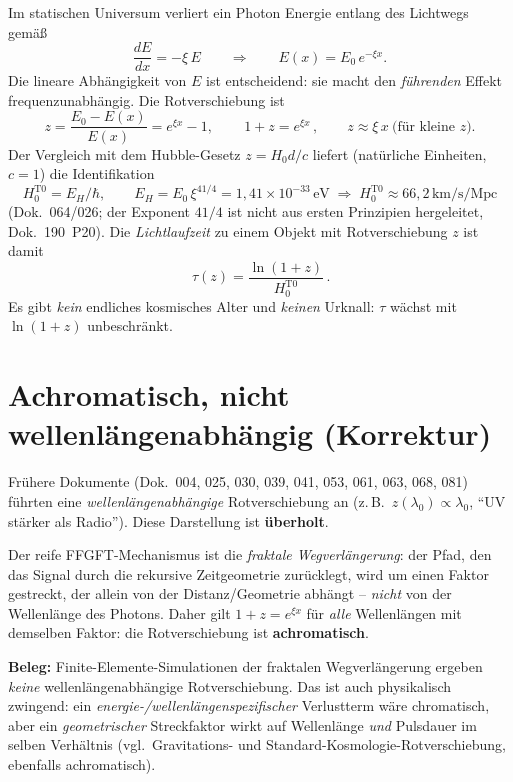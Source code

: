 Im statischen Universum verliert ein Photon Energie entlang des Lichtwegs gemäß
\[
  \frac{dE}{dx} = -\xi\,E
  \qquad\Longrightarrow\qquad
  E(x) = E_0\,e^{-\xi x}.
\]
Die lineare Abhängigkeit von $E$ ist entscheidend: sie macht den \emph{führenden}
Effekt frequenzunabhängig. Die Rotverschiebung ist
\[
  z = \frac{E_0 - E(x)}{E(x)} = e^{\xi x} - 1,
  \qquad
  \boxed{\,1+z = e^{\xi x}\,},
  \qquad z \approx \xi\,x \ \text{(für kleine } z).
\]
Der Vergleich mit dem Hubble-Gesetz $z = H_0 d/c$ liefert (natürliche Einheiten,
$c=1$) die Identifikation
\[
  H_0^{\text{T0}} = E_H/\hbar,\qquad E_H = E_0\,\xi^{41/4} = 1{,}41\times10^{-33}\,\text{eV}
  \;\Rightarrow\; H_0^{\text{T0}} \approx 66{,}2\,\text{km/s/Mpc}
\]
(Dok.~064/026; der Exponent $41/4$ ist nicht aus ersten Prinzipien hergeleitet,
Dok.~190~P20). Die \emph{Lichtlaufzeit} zu einem Objekt mit Rotverschiebung $z$ ist
damit
\[
  \boxed{\,\tau(z) = \frac{\ln(1+z)}{H_0^{\text{T0}}}\,}.
\]
Es gibt \emph{kein} endliches kosmisches Alter und \emph{keinen} Urknall: $\tau$
wächst mit $\ln(1+z)$ unbeschränkt.

\section{Achromatisch, nicht wellenlängenabhängig (Korrektur)}

Frühere Dokumente (Dok.~004, 025, 030, 039, 041, 053, 061, 063, 068, 081) führten
eine \emph{wellenlängenabhängige} Rotverschiebung an (z.\,B.\ $z(\lambda_0)\propto\lambda_0$,
\enquote{UV stärker als Radio}). Diese Darstellung ist \textbf{überholt}.

Der reife FFGFT-Mechanismus ist die \emph{fraktale Wegverlängerung}: der Pfad, den
das Signal durch die rekursive Zeitgeometrie zurücklegt, wird um einen Faktor
gestreckt, der allein von der Distanz/Geometrie abhängt -- \emph{nicht} von der
Wellenlänge des Photons. Daher gilt $1+z = e^{\xi x}$ für \emph{alle} Wellenlängen
mit demselben Faktor: die Rotverschiebung ist \textbf{achromatisch}.

\textbf{Beleg:} Finite-Elemente-Simulationen der fraktalen Wegverlängerung ergeben
\emph{keine} wellenlängenabhängige Rotverschiebung. Das ist auch physikalisch
zwingend: ein \emph{energie-/wellenlängenspezifischer} Verlustterm wäre chromatisch,
aber ein \emph{geometrischer} Streckfaktor wirkt auf Wellenlänge \emph{und}
Pulsdauer im selben Verhältnis (vgl.\ Gravitations- und Standard-Kosmologie-Rotverschiebung,
ebenfalls achromatisch).

